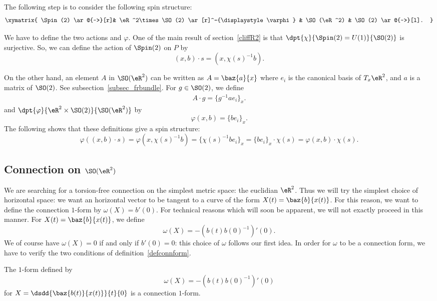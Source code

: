 The following step is to consider the following spin structure:
\[\xymatrix{
	\Spin(2)  \ar@{~>}[r]&  \eR^2\times \SO(2) \ar[r]^-{\displaystyle\varphi} & \SO(\eR^2)  & \SO(2) \ar@{~>}[l].
	}\]

We have to define the two actions and $\varphi$. One of the main result of section~\ref{cliffR2} is that $\dpt{\chi}{\Spin(2)=U(1)}{\SO(2)}$ is surjective. So, we can define the action of $\Spin(2)$ on $P$ by
\[(x,b)\cdot s=(x,\chi(s)^{-1} b).\]

On the other hand, an element $A$ in $\SO(\eR^2)$ can be written as $A=\baz{a}{x}$ where $e_i$ is the canonical basis of $T_x\eR^2$, and $a$ is a matrix of $\SO(2)$. See subsection~\ref{subsec_frbundle}. For $g\in \SO(2)$, we define
\begin{eqnarray}
	\label{r1504d2}A\cdot g=\{g^{-1} ae_i\}_x.
\end{eqnarray}
and  $\dpt{\varphi}{\eR^2\times \SO(2)}{\SO(\eR^2)}$ by
\[
	\varphi(x,b)=\{be_i\}_x.
\]
The following shows that these definitions give a spin structure:
\begin{equation}
	\varphi((x,b)\cdot s)=\varphi(x,\chi(s)^{-1} b)
	=\{\chi(s)^{-1} be_i\}_x
	=\{be_i\}_x\cdot\chi(s)
	=\varphi(x,b)\cdot\chi(s).
\end{equation}


\subsection{Connection on \texorpdfstring{$\SO(\eR^2)$}{SO(R2)}}

We are searching for a torsion-free connection on the simplest metric space: the euclidian $\eR^2$. Thus we will try the simplest choice of horizontal space: we want an horizontal vector to be tangent to a curve of the form $X(t)=\baz{b}{x(t)}$. For this reason, we want to define the connection $1$-form by $\omega(X)=b'(0)$. For technical reasons which will soon be apparent, we will not exactly proceed in this manner. For $X(t)=\baz{b}{x(t)}$, we define
\begin{equation}
	\omega(X)=-(b(t)b(0)^{-1})'(0).
\end{equation}
We of course have $\omega(X)=0$ if and only if $b'(0)=0$: this choice of $\omega$ follows our first idea. In order for $\omega$ to be a connection form, we have to verify the two conditions of definition~\ref{defconnform}.

\begin{proposition}
	The $1$-form defined by
	\[
		\omega(X)=-(b(t)b(0)^{-1})'(0)
	\]
	for $X=\displaystyle\dsdd{\baz{b(t)}{x(t)}}{t}{0}$ is a connection $1$-form.
\end{proposition}

